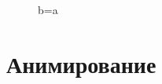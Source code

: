 				\begin{figure}[h!]	
				\def\svgwidth{\columnwidth}
				\caption{b=a} 
				\label{vert_sliging_10ba}
		\end{figure}		
\section{Анимирование}
